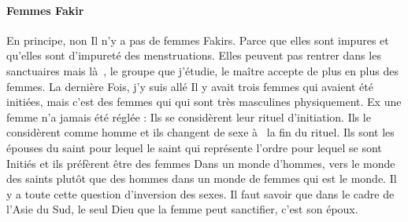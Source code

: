 \paragraph{Femmes Fakir} En principe, non  Il n'y a pas de femmes Fakirs. Parce que elles sont impures et qu'elles sont 
d'impureté 
des menstruations.  Elles peuvent pas rentrer dans les sanctuaires mais là , le groupe que j'étudie, le maître accepte de plus en plus des femmes. La dernière 
Fois, j'y suis allé  Il y avait trois femmes qui  avaient été initiées, mais c'est des femmes qui  
qui  sont très 
masculines physiquement. Ex une femme n'a jamais été réglée : 
Ils se considèrent leur rituel 
d'initiation.  Ils le considèrent comme homme
   et ils changent 
de sexe   à  la fin du 
rituel. Ils sont les épouses 
du saint pour lequel le saint qui  représente l'ordre pour lequel se sont 
Initiés et ils préfèrent être des femmes 
Dans un monde d'hommes, vers le monde des saints plutôt que des hommes dans un monde de femmes qui  est le monde. 
Il y a toute cette question d'inversion des sexes. Il faut savoir que dans le cadre de 
l'Asie du 
Sud, le seul Dieu que la femme peut sanctifier, c'est son époux. 
 
